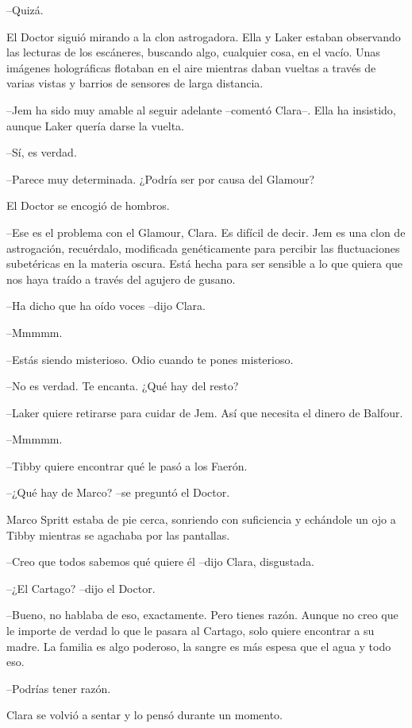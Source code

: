 {--Quizá.}

{El Doctor siguió mirando a la clon astrogadora. Ella y Laker estaban
 observando las lecturas de los escáneres, buscando algo, cualquier cosa,
 en el vacío. Unas imágenes holográficas flotaban en el aire mientras
 daban vueltas a través de varias vistas y barrios de sensores de larga
distancia.}

{--Jem ha sido muy amable al seguir adelante --comentó Clara--. Ella ha
insistido, aunque Laker quería darse la vuelta.}

{--Sí, es verdad.}

{--Parece muy determinada. ¿Podría ser por causa del Glamour?}

{El Doctor se encogió de hombros.}

{--Ese es el problema con el Glamour, Clara. Es difícil de decir. Jem es
 una clon de astrogación, recuérdalo, modificada genéticamente para
 percibir las fluctuaciones subetéricas en la materia oscura. Está hecha
 para ser sensible a lo que quiera que nos haya traído a través del
agujero de gusano.}

{--Ha dicho que ha oído voces --dijo Clara.}

{--Mmmmm.}

{--Estás siendo misterioso. Odio cuando te pones misterioso.}

{--No es verdad. Te encanta. ¿Qué hay del resto?}

{--Laker quiere retirarse para cuidar de Jem. Así que necesita el dinero
de Balfour.}

{--Mmmmm.}

{--Tibby quiere encontrar qué le pasó a los Faerón.}

{--¿Qué hay de Marco? --se preguntó el Doctor.}

{Marco Spritt estaba de pie cerca, sonriendo con suficiencia y echándole
un ojo a Tibby mientras se agachaba por las pantallas.}

{--Creo que todos sabemos qué quiere él --dijo Clara, disgustada.}

{--¿El Cartago? --dijo el Doctor.}

{--Bueno, no hablaba de eso, exactamente. Pero tienes razón. Aunque no
 creo que le importe de verdad lo que le pasara al Cartago, solo quiere
 encontrar a su madre. La familia es algo poderoso, la sangre es más
espesa que el agua y todo eso.}

{--Podrías tener razón.}

{Clara se volvió a sentar y lo pensó durante un momento.}

